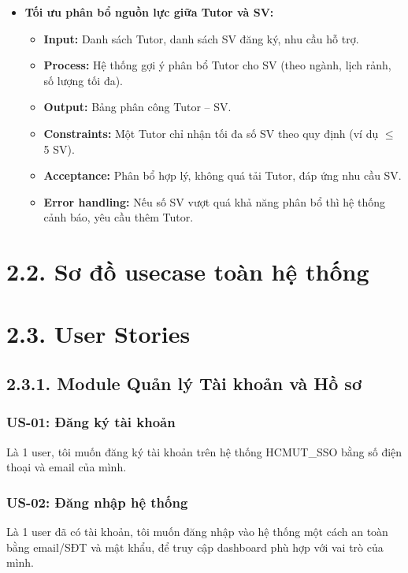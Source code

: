 \begin{itemize}
    \item \textbf{Tối ưu phân bổ nguồn lực giữa Tutor và SV:}
    \begin{itemize}
        \item \textbf{Input:} Danh sách Tutor, danh sách SV đăng ký, nhu cầu hỗ trợ.
        \item \textbf{Process:} Hệ thống gợi ý phân bổ Tutor cho SV (theo ngành, lịch rảnh, số lượng tối đa).
        \item \textbf{Output:} Bảng phân công Tutor – SV.
        \item \textbf{Constraints:} Một Tutor chỉ nhận tối đa số SV theo quy định (ví dụ $\leq$ 5 SV).
        \item \textbf{Acceptance:} Phân bổ hợp lý, không quá tải Tutor, đáp ứng nhu cầu SV.
        \item \textbf{Error handling:} Nếu số SV vượt quá khả năng phân bổ thì hệ thống cảnh báo, yêu cầu thêm Tutor.
    \end{itemize}
\end{itemize}



\section*{2.2. Sơ đồ usecase toàn hệ thống}


\section*{2.3. User Stories}
\subsection*{2.3.1. Module Quản lý Tài khoản và Hồ sơ}
\subsubsection*{US-01: Đăng ký tài khoản} 
Là 1 user, tôi muốn đăng ký tài khoản trên hệ thống HCMUT\_SSO bằng số điện thoại và email của mình.
\subsubsection*{US-02: Đăng nhập hệ thống} 
Là 1 user đã có tài khoản, tôi muốn đăng nhập vào hệ thống một cách an toàn bằng email/SĐT và mật khẩu, để truy cập dashboard phù hợp với vai trò của mình.
